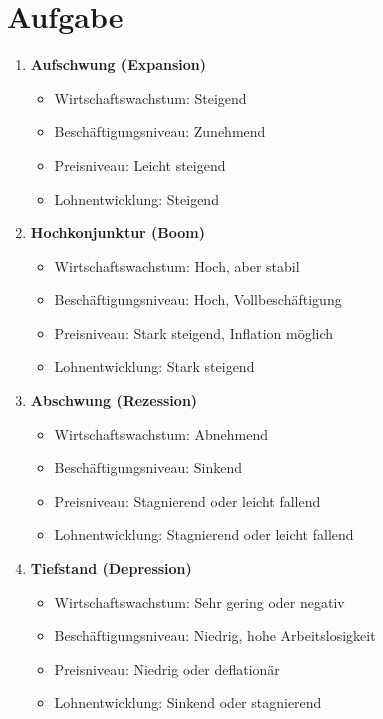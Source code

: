 \documentclass[12pt,a4paper]{report}
\begin{document}
	\section{Aufgabe}
	
	\begin{enumerate}
   	\item \textbf{Aufschwung (Expansion)}
   	\begin{itemize}
      	\item Wirtschaftswachstum: Steigend
      	\item Beschäftigungsniveau: Zunehmend
      	\item Preisniveau: Leicht steigend
       	\item Lohnentwicklung: Steigend
    	\end{itemize}
	   \item \textbf{Hochkonjunktur (Boom)}
    	\begin{itemize}
      	\item Wirtschaftswachstum: Hoch, aber stabil
      	\item Beschäftigungsniveau: Hoch, Vollbeschäftigung
      	\item Preisniveau: Stark steigend, Inflation möglich
      	\item Lohnentwicklung: Stark steigend
    	\end{itemize}
    	\item \textbf{Abschwung (Rezession)}
    	\begin{itemize}
      	\item Wirtschaftswachstum: Abnehmend
      	\item Beschäftigungsniveau: Sinkend
      	\item Preisniveau: Stagnierend oder leicht fallend
      	\item Lohnentwicklung: Stagnierend oder leicht fallend
    	\end{itemize}
    	\item \textbf{Tiefstand (Depression)}
    	\begin{itemize}
      	\item Wirtschaftswachstum: Sehr gering oder negativ
      	\item Beschäftigungsniveau: Niedrig, hohe Arbeitslosigkeit
      	\item Preisniveau: Niedrig oder deflationär
      	\item Lohnentwicklung: Sinkend oder stagnierend
    	\end{itemize}
	\end{enumerate}
	
\end{document}
